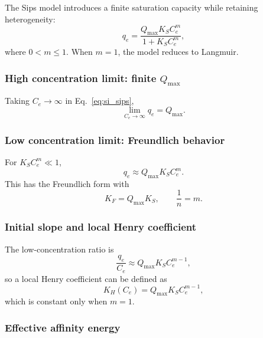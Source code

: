 \documentclass[journal=jacsat,manuscript=article]{achemso}
\begin{document}
The Sips model introduces a finite saturation capacity while retaining
heterogeneity:
\begin{equation}
	q_e = \frac{Q_{\max} K_S C_e^{m}}{1 + K_S C_e^{m}},
	\label{eq:si_sips}
\end{equation}
where \(0 < m \leq 1\). When \(m = 1\), the model reduces to Langmuir.

\subsubsection{High concentration limit: finite \(Q_{\max}\)}

Taking \(C_e \to \infty\) in Eq.~\eqref{eq:si_sips},
\begin{equation}
	\lim_{C_e \to \infty} q_e = Q_{\max}.
\end{equation}

\subsubsection{Low concentration limit: Freundlich behavior}

For \(K_S C_e^{m} \ll 1\),
\begin{equation}
	q_e \approx Q_{\max} K_S C_e^{m}.
\end{equation}
This has the Freundlich form with
\begin{equation}
	K_F = Q_{\max} K_S,
	\qquad \frac{1}{n} = m.
\end{equation}

\subsubsection{Initial slope and local Henry coefficient}

The low-concentration ratio is
\begin{equation}
	\frac{q_e}{C_e}
	\approx Q_{\max} K_S C_e^{m-1},
\end{equation}
so a local Henry coefficient can be defined as
\begin{equation}
	K_H(C_e) = Q_{\max} K_S C_e^{m - 1},
\end{equation}
which is constant only when \(m = 1\).

\subsubsection{Effective affinity energy}
\end{document}
